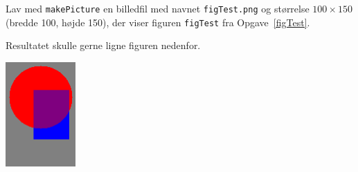 Lav med \texttt{makePicture} en billedfil med navnet
  \texttt{figTest.png} og størrelse $100\times150$ (bredde 100, højde 150),
  der viser figuren \texttt{figTest} fra Opgave~\ref{figTest}.

  Resultatet skulle gerne ligne figuren nedenfor.
  \begin{center}
    \includegraphics[width=0.2\textwidth]{figTest.png}
  \end{center}